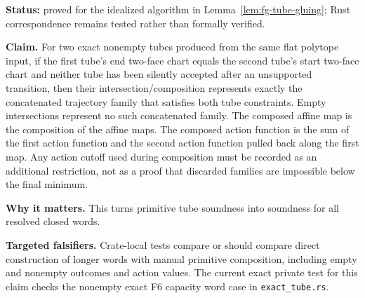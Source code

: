 \begin{unverified}
\begin{remark}%
\label{rem:fg-pr-tube-intersection-concatenation}
\textbf{Status:} proved for the idealized algorithm in
Lemma~\ref{lem:fg-tube-gluing}; Rust correspondence remains tested rather than
formally verified.

\textbf{Claim.}  For two exact nonempty tubes produced from the same flat
polytope input, if the first tube's end two-face chart equals the second tube's
start two-face chart and neither tube has been silently accepted after an
unsupported transition, then their intersection/composition represents exactly
the concatenated trajectory family that satisfies both tube constraints.  Empty
intersections represent no such concatenated family.  The composed affine map
is the composition of the affine maps.  The composed action function is the sum
of the first action function and the second action function pulled back along
the first map.  Any action cutoff used during composition must be recorded as
an additional restriction, not as a proof that discarded families are impossible
below the final minimum.

\textbf{Why it matters.}  This turns primitive tube soundness into soundness for
all resolved closed words.

\textbf{Targeted falsifiers.}  Crate-local tests compare or should compare direct
construction of longer words with manual primitive composition, including empty
and nonempty outcomes and action values.  The current exact private test for
this claim checks the nonempty exact F6 capacity word case in
\texttt{exact\_tube.rs}.
\end{remark}
\end{unverified}

